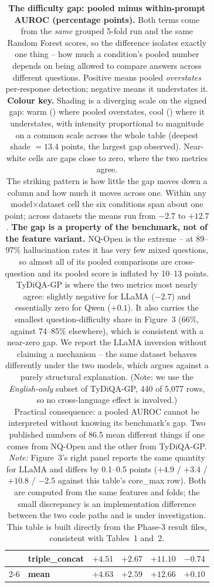 \documentclass[11pt,a4paper]{article}
\begin{document}
\begin{table}[h]
\begin{tabular}{llcccc}
  & triple\_concat & \cellcolor{gapPos!22}$+4.51$ & \cellcolor{gapPos!13}$+2.67$ & \cellcolor{gapPos!53}$+11.10$ & \cellcolor{gapNeg!4}$-0.74$ \\
\cmidrule(lr){2-6}
  & \textbf{mean}  & \cellcolor{gapPos!22}$\mathbf{+4.63}$ & \cellcolor{gapPos!12}$\mathbf{+2.59}$ & \cellcolor{gapPos!61}$\mathbf{+12.66}$ & \cellcolor{gapPos!1}$\mathbf{+0.10}$ \\
\bottomrule
\end{tabular}
\caption{\textbf{The difficulty gap: pooled minus within-prompt AUROC (percentage points).} Both
terms come from the \emph{same} grouped 5-fold run and the same Random Forest scores, so the
difference isolates exactly one thing -- how much a condition's pooled number depends on being
allowed to compare answers across different questions. Positive means pooled \emph{overstates}
per-response detection; negative means it understates it.
\\[2pt]
\textbf{Colour key.} Shading is a diverging scale on the signed gap: warm
(\phantom{xx}) where pooled overstates, cool
(\phantom{xx}) where it understates, with intensity proportional to
magnitude on a common scale across the whole table (deepest shade $=13.4$ points, the largest gap
observed). Near-white cells are gaps close to zero, where the two metrics agree.
\\[2pt]
The striking pattern is how little the gap moves down a column and how much it moves across one.
Within any model$\times$dataset cell the six conditions span about one point; across datasets the
means run from $-2.7$ to $+12.7$. \textbf{The gap is a property of the benchmark, not of the
feature variant.} NQ-Open is the extreme -- at 89--97\% hallucination rates it has very few mixed
questions, so almost all of its pooled comparisons are cross-question and its pooled score is
inflated by 10--13 points. TyDiQA-GP is where the two metrics most nearly agree: slightly negative for
LLaMA ($-2.7$) and essentially zero for Qwen ($+0.1$). It also carries the smallest
question-difficulty share in Figure~3 (66\%, against 74--85\% elsewhere), which is consistent with
a near-zero gap. We report the LLaMA inversion without claiming a mechanism -- the same dataset
behaves differently under the two models, which argues against a purely structural explanation.
(Note: we use the \emph{English-only} subset of TyDiQA-GP, 440 of 5{,}077 rows, so no
cross-language effect is involved.)
\\[2pt]
Practical consequence: a pooled AUROC cannot be interpreted without knowing its benchmark's gap.
Two published numbers of 86.5 mean different things if one comes from NQ-Open and the other from
TyDiQA-GP.
\\[2pt]
\emph{Note:} Figure~3's right panel reports the same quantity for LLaMA and differs by
0.1--0.5 points ($+4.9$ / $+3.4$ / $+10.8$ / $-2.5$ against this table's core\_max row). Both are
computed from the same features and folds; the small discrepancy is an implementation difference
between the two code paths and is under investigation. This table is built directly from the
Phase-3 result files, consistent with Tables~1 and~2.}
\end{table}
\end{document}
